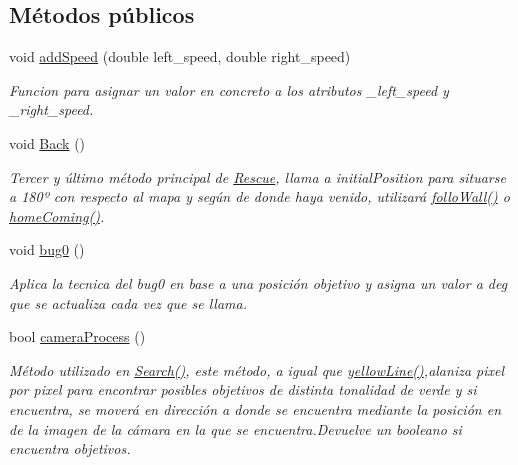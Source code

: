\subsection*{Métodos públicos}
\begin{DoxyCompactItemize}
\item 
void \hyperlink{classRescue_a9a430924f65d71eca4e02dc9b2704947_a9a430924f65d71eca4e02dc9b2704947}{add\+Speed} (double left\+\_\+speed, double right\+\_\+speed)
\begin{DoxyCompactList}\small\item\em Funcion para asignar un valor en concreto a los atributos \+\_\+left\+\_\+speed y \+\_\+right\+\_\+speed. \end{DoxyCompactList}\item 
void \hyperlink{classRescue_a5acc91c16b60baf09a87f440a22f030f_a5acc91c16b60baf09a87f440a22f030f}{Back} ()
\begin{DoxyCompactList}\small\item\em Tercer y último método principal de \hyperlink{classRescue}{Rescue}, llama a initial\+Position para situarse a 180º con respecto al mapa y según de donde haya venido, utilizará \hyperlink{classRescue_aa9f20abea5898b53b03db91f2a323982_aa9f20abea5898b53b03db91f2a323982}{follo\+Wall()} o \hyperlink{classRescue_a85cbbec8d486f16e260d3f74c3221831_a85cbbec8d486f16e260d3f74c3221831}{home\+Coming()}. \end{DoxyCompactList}\item 
void \hyperlink{classRescue_a4e3ec37a662b2cb91df3dcb0a875acf9_a4e3ec37a662b2cb91df3dcb0a875acf9}{bug0} ()
\begin{DoxyCompactList}\small\item\em Aplica la tecnica del bug0 en base a una posición objetivo y asigna un valor a deg que se actualiza cada vez que se llama. \end{DoxyCompactList}\item 
bool \hyperlink{classRescue_a8fca4fbd58ec9ccab6fc88424b16723f_a8fca4fbd58ec9ccab6fc88424b16723f}{camera\+Process} ()
\begin{DoxyCompactList}\small\item\em Método utilizado en \hyperlink{classRescue_a3ea9a01b97d0291afa704bff73564938_a3ea9a01b97d0291afa704bff73564938}{Search()}, este método, a igual que \hyperlink{classRescue_ab1ea1e98e62403dc681f26529805fe2a_ab1ea1e98e62403dc681f26529805fe2a}{yellow\+Line()},alaniza pixel por pixel para encontrar posibles objetivos de distinta tonalidad de verde y si encuentra, se moverá en dirección a donde se encuentra mediante la posición en de la imagen de la cámara en la que se encuentra.\+Devuelve un booleano si encuentra objetivos. \end{DoxyCompactList}\item 

\end{DoxyCompactItemize}
